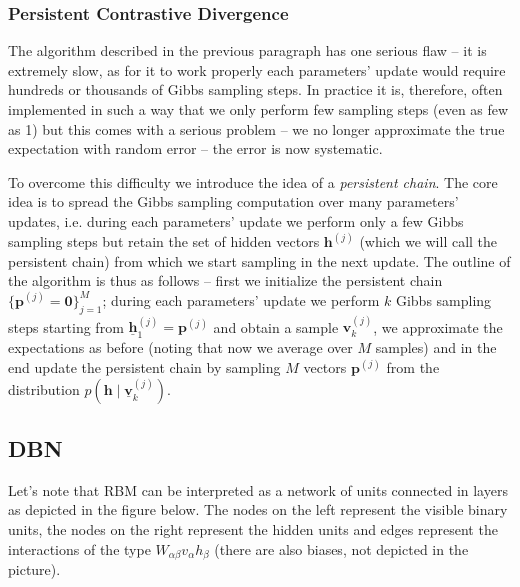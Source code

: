 \documentclass{myclass}
\begin{document}
\subsubsection{Persistent Contrastive Divergence}

The algorithm described in the previous paragraph has one serious flaw -- it is extremely slow, as
for it to work properly each parameters' update would require hundreds or thousands of Gibbs
sampling steps. In practice it is, therefore, often implemented in such a way that we only perform
few sampling steps (even as few as 1) but this comes with a serious problem -- we no longer
approximate the true expectation with random error -- the error is now systematic.

To overcome this difficulty we introduce the idea of a \emph{persistent chain}. The core idea is to
spread the Gibbs sampling computation over many parameters' updates, i.e. during each parameters'
update we perform only a few Gibbs sampling steps but retain the set of hidden vectors
\(\bm{h}^{(j)}\) (which we will call the persistent chain) from which we start sampling in the next
update. The outline of the algorithm is thus as follows -- first we initialize the persistent chain
\(\{\bm{p}^{(j)} = \bm{0}\}_{j=1}^M\); during each parameters' update we perform \(k\) Gibbs
sampling steps starting from \(\underline{\bm{h}}_1^{(j)} = \bm{p}^{(j)}\) and obtain a sample
\(\bm{v}_k^{(j)}\), we approximate the expectations as before (noting that now we average over \(M\)
samples) and in the end update the persistent chain by sampling \(M\) vectors \(\bm{p}^{(j)}\) from
the distribution \(p(\bm{h} \mid \underline{\bm{v}}_k^{(j)})\).

\subsection{DBN}

Let's note that RBM can be interpreted as a network of units connected in layers as depicted in the
figure below. The nodes on the left represent the visible binary units, the nodes on the right
represent the hidden units and edges represent the interactions of the type \(W_{\alpha\beta}
v_\alpha h _\beta\) (there are also biases, not depicted in the picture).
\end{document}
